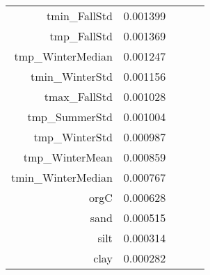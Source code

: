 \begin{tabular}{rrrrr}
tmin_FallStd & 0.001399 \\
tmp_FallStd & 0.001369 \\
tmp_WinterMedian & 0.001247 \\
tmin_WinterStd & 0.001156 \\
tmax_FallStd & 0.001028 \\
tmp_SummerStd & 0.001004 \\
tmp_WinterStd & 0.000987 \\
tmp_WinterMean & 0.000859 \\
tmin_WinterMedian & 0.000767 \\
orgC & 0.000628 \\
sand & 0.000515 \\
silt & 0.000314 \\
clay & 0.000282 \\
\bottomrule
\end{tabular}
